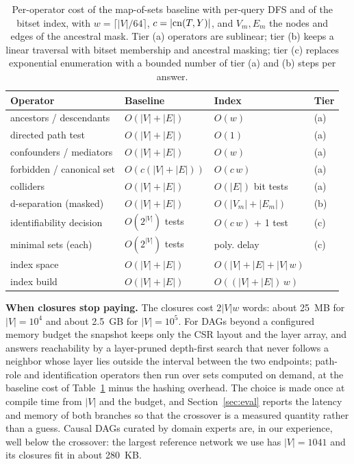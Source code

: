 \begin{table}[t]\centering
\caption{Per-operator cost of the map-of-sets baseline with per-query DFS and
of the bitset index, with $w = \lceil |V|/64 \rceil$, $c = |\mathrm{cn}(T,Y)|$, and
$V_m, E_m$ the nodes and edges of the ancestral mask. Tier (a) operators are sublinear;
tier (b) keeps a linear traversal with bitset membership and ancestral
masking; tier (c) replaces exponential enumeration with a bounded number of
tier (a) and (b) steps per answer.}
\label{tab:complexity}
\footnotesize
\setlength{\tabcolsep}{3pt}
\begin{tabular}{@{}llll@{}}
\toprule
Operator & Baseline & Index & Tier \\
\midrule
ancestors / descendants & $O(|V|{+}|E|)$ & $O(w)$ & (a) \\
directed path test      & $O(|V|{+}|E|)$ & $O(1)$ & (a) \\
confounders / mediators & $O(|V|{+}|E|)$ & $O(w)$ & (a) \\
forbidden / canonical set & $O(c(|V|{+}|E|))$ & $O(c\,w)$ & (a) \\
colliders               & $O(|V|{+}|E|)$ & $O(|E|)$ bit tests & (a) \\
d-separation (masked)   & $O(|V|{+}|E|)$ & $O(|V_m|{+}|E_m|)$ & (b) \\
identifiability decision & $O(2^{|V|})$ tests & $O(c\,w)$ + 1 test & (c) \\
minimal sets (each)     & $O(2^{|V|})$ tests & poly. delay & (c) \\
\midrule
index space             & $O(|V|{+}|E|)$ & $O(|V|{+}|E| + |V|\,w)$ & \\
index build             & $O(|V|{+}|E|)$ & $O((|V|{+}|E|)\,w)$ & \\
\bottomrule
\end{tabular}
\end{table}

\noindent\textbf{When closures stop paying.} The closures cost $2|V|w$ words:
about 25~MB for $|V| = 10^4$ and about 2.5~GB for $|V| = 10^5$. For DAGs
beyond a configured memory budget the snapshot keeps only the CSR layout and
the layer array, and answers reachability by a layer-pruned depth-first search
that never follows a neighbor whose layer lies outside the interval between
the two endpoints; path-role and identification operators then run over
sets computed on demand, at the baseline cost of Table~\ref{tab:complexity}
minus the hashing overhead. The choice is made once at compile time from
$|V|$ and the budget, and Section~\ref{sec:eval} reports the latency and
memory of both branches so that the crossover is a measured quantity rather
than a guess. Causal DAGs curated by domain experts are, in our experience,
well below the crossover: the largest reference network we use has
$|V| = 1041$ and its closures fit in about 280~KB.
